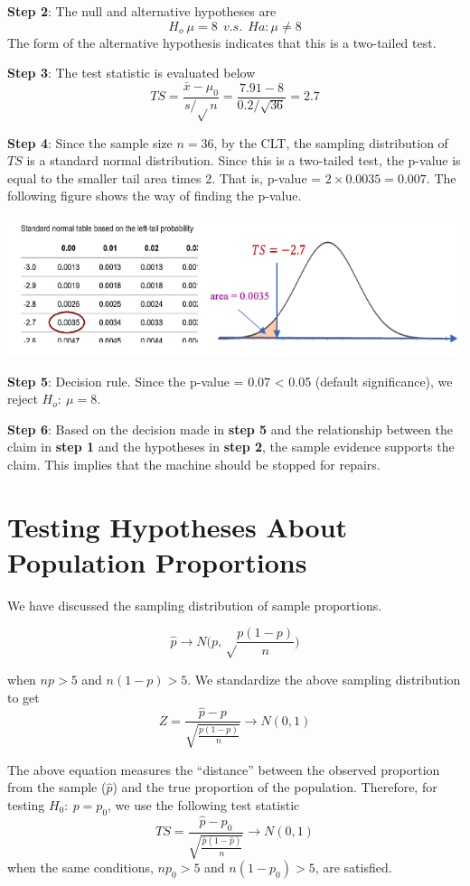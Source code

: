 \documentclass[
]{book}
\begin{document}
\textbf{Step 2}: The null and alternative hypotheses are
\[H_o \    \mu = 8  \ \  v.s.  \ \  Ha: \mu \ne 8 \]
The form of the alternative hypothesis indicates that this is a two-tailed test.

\textbf{Step 3}: The test statistic is evaluated below
\[
TS = \frac{\bar{x} - \mu_0}{s/\sqrt{}n} = \frac{7.91 - 8}{0.2/\sqrt{36}} = 2.7  
\]

\textbf{Step 4}: Since the sample size \(n = 36\), by the CLT, the sampling distribution of \(TS\) is a standard normal distribution. Since this is a two-tailed test, the p-value is equal to the smaller tail area times 2. That is, p-value = \(2 \times 0.0035 = 0.007\). The following figure shows the way of finding the p-value.

\begin{center}\includegraphics[width=0.65\linewidth]{week09/example02} \end{center}

\textbf{Step 5}: Decision rule. Since the p-value = 0.07 \textless{} 0.05 (default significance), we reject \(H_o: \  \mu = 8\).

\textbf{Step 6}: Based on the decision made in \textbf{step 5} and the relationship between the claim in \textbf{step 1} and the hypotheses in \textbf{step 2}, the sample evidence supports the claim. This implies that the machine should be stopped for repairs.

\hfill\break

\hypertarget{testing-hypotheses-about-population-proportions}{%
\section{Testing Hypotheses About Population Proportions}\label{testing-hypotheses-about-population-proportions}}

We have discussed the sampling distribution of sample proportions.

\[
\hat{p} \to N\Big(p, \sqrt\frac{p(1-p)}{n} \Big)
\]

when \(np > 5\) and \(n(1-p) > 5\). We standardize the above sampling distribution to get
\[
Z = \frac{\hat{p}-p}{\sqrt{\frac{p(1-p)}{n}}} \to N(0,1)
\]

The above equation measures the ``distance'' between the observed proportion from the sample (\(\hat{p}\)) and the true proportion of the population. Therefore, for testing \(H_0: \ p = p_0\), we use the following test statistic
\[
TS = \frac{\hat{p}-p_0}{\sqrt{\frac{\hat{p}(1-\hat{p})}{n}}} \to N(0,1)
\]
when the same conditions, \(np_0 > 5\) and \(n(1-p_0) > 5\), are satisfied.
\end{document}
